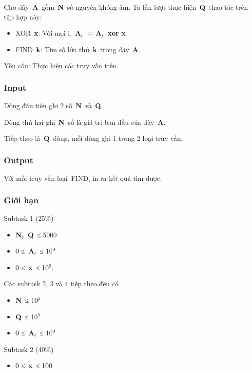 

Cho dãy \textbf{A} gồm \textbf{N} số nguyên không âm. Ta lần lượt thực hiện \textbf{Q} thao tác trên tập hợp này:
\begin{itemize}
	\item XOR \textbf{x}: Với mọi i, \textbf{A$_i$ = A$_i$ xor x}
	\item FIND \textbf{k}: Tìm số lớn thứ \textbf{k} trong dãy \textbf{A}.
\end{itemize}

Yêu cầu: Thực hiện các truy vấn trên.

\subsubsection{Input}

Dòng đầu tiên ghi 2 số \textbf{N} và \textbf{Q}.

Dòng thứ hai ghi \textbf{N} số là giá trị ban đầu của dãy \textbf{A}.

Tiếp theo là \textbf{Q} dòng, mỗi dòng ghi 1 trong 2 loại truy vấn.

\subsubsection{Output}

Với mỗi truy vấn loại FIND, in ra kết quả tìm được.

\subsubsection{Giới hạn}

Subtask 1 (25\%)
\begin{itemize}
	\item \textbf{N}\textbf{, }\textbf{Q} ≤ 5000
	\item 0 ≤ \textbf{A$_i$} ≤ 10$^9$
	\item 0 ≤ \textbf{x} ≤ 10$^9$.
\end{itemize}

Các subtask 2, 3 và 4 tiếp theo đều có
\begin{itemize}
	\item \textbf{N} ≤ 10$^5$
	\item \textbf{Q} ≤ 10$^5$
	\item 0 ≤ \textbf{A$_i$} ≤ 10$^9$
\end{itemize}

Subtask 2 (40\%)
\begin{itemize}
	\item 0 ≤ \textbf{x} ≤ 100
\end{itemize}

